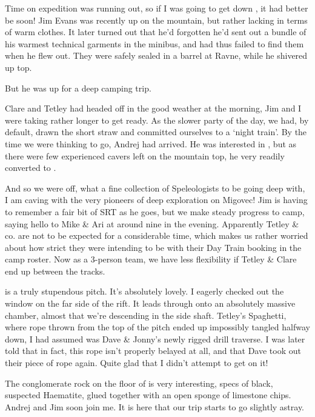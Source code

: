 Time on expedition was running out, so if I was going to get down
, it had better be soon! Jim Evans was
recently up on the mountain, but rather lacking in terms of warm
clothes. It later turned out that he'd forgotten he'd sent out a bundle
of his warmest technical garments in the minibus, and had thus failed to
find them when he flew out. They were safely sealed in a barrel at
Ravne, while he shivered up top.

But he was up for a deep camping trip.

Clare and Tetley had headed off in the good weather at the morning, Jim
and I were taking rather longer to get ready. As the slower party of the
day, we had, by default, drawn the short straw and committed ourselves
to a `night train'. By the time we were thinking to go, Andrej had
arrived. He was interested in , but as there were few
experienced cavers left on the mountain top, he very readily converted
to .

And so we were off, what a fine collection of Speleologists to be going
deep with, I am caving with the very pioneers of deep exploration on
Migovec! Jim is having to remember a fair bit of SRT as he goes, but we
make steady progress to camp, saying hello to Mike \& Ari at around nine
in the evening. Apparently Tetley \& co. are not to be expected for a
considerable time, which makes us rather worried about how strict they
were intending to be with their Day Train booking in the camp roster.
Now as a 3-person team, we have less flexibility if Tetley \& Clare end
up between the tracks.

 is a truly stupendous pitch. It's absolutely lovely. I eagerly
checked out the window on the far side of the rift. It leads through
onto an absolutely massive chamber, almost that we're descending in the
side shaft. Tetley's Spaghetti, where rope thrown from the top of the
pitch ended up impossibly tangled halfway down, I had assumed was Dave
\& Jonny's newly rigged drill traverse. I was later told that in fact,
this rope isn't properly belayed at all, and that Dave took out their
piece of rope again. Quite glad that I didn't attempt to get on it!

The conglomerate rock on the floor of  is
very interesting, specs of black, suspected Haematite, glued together
with an open sponge of limestone chips. Andrej and Jim soon join me. It
is here that our trip starts to go slightly astray.

